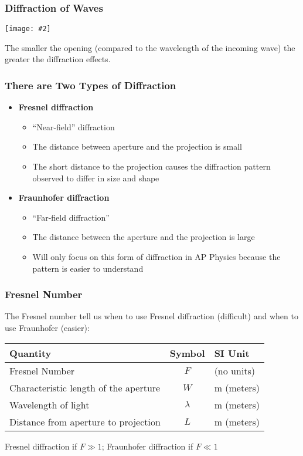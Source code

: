 \documentclass[compress,aspectratio=169]{beamer}
\newcommand{\pic}[2]{\texttt{[image: \#2]}}
\newcommand{\eq}[2]{\vspace{#1}{\LARGE\begin{displaymath}#2\end{displaymath}}}
\begin{document}
\begin{frame}
  \frametitle{Diffraction of Waves}
  \begin{center}
    \pic{.6}{diffraction1.jpg}
  \end{center}
  The smaller the opening (compared to the wavelength of the incoming wave)
  the greater the diffraction effects.
\end{frame}

\begin{frame}
  \frametitle{There are Two Types of Diffraction}
  \begin{itemize}
  \item\textbf{Fresnel diffraction}
    \begin{itemize}
    \item ``Near-field'' diffraction
    \item The distance between aperture and the projection is small
    \item The short distance to the projection causes the diffraction pattern
      observed to differ in size and shape
    \end{itemize}
  \item\textbf{Fraunhofer diffraction}
    \begin{itemize}
    \item ``Far-field diffraction''
    \item The distance between the aperture and the projection is large
    \item Will only focus on this form of diffraction in AP Physics because
      the pattern is easier to understand
    \end{itemize}
  \end{itemize}
\end{frame}

\begin{frame}
  \frametitle{Fresnel Number}
  The Fresnel number tell us when to use Fresnel diffraction (difficult) and
  when to use Fraunhofer (easier):

  \eq{-.3in}{
    F=\frac{W^2}{\lambda L}
  }
  \begin{center}
    \begin{tabular}{l|c|l}
      \rowcolor{pink}
      \textbf{Quantity} & \textbf{Symbol} & \textbf{SI Unit} \\ \hline
      Fresnel Number        & $F$         & (no units) \\
      Characteristic length of the aperture & $W$ & \si{\metre} (meters)\\
      Wavelength of light   & $\lambda$           & \si{\metre} (meters)\\
      Distance from aperture to projection & $L$  & \si{\metre} (meters)
    \end{tabular}
  \end{center}
  Fresnel diffraction if $F\gg 1$; Fraunhofer diffraction if $F\ll 1$
\end{frame}
\end{document}
